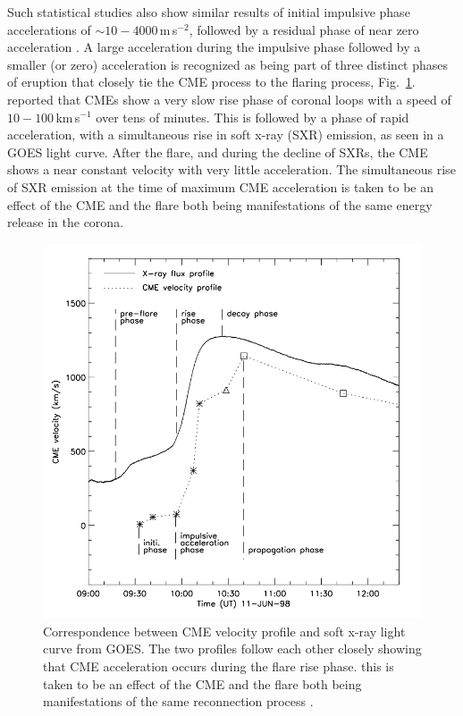 Such statistical studies also show similar results of initial impulsive phase accelerations of $\sim10-4000$\,m\,s$^{-2}$, followed by a residual phase of near zero acceleration \citep{vrsnak2007, temmer2010}. A large acceleration during the impulsive phase followed by a smaller (or zero) acceleration is recognized as being part of three distinct phases of eruption that closely tie the CME process to the flaring process, Fig.~\ref{fig:zhang2001}. \citet{zhang2001, zhang2004} reported that CMEs show a very slow rise phase of coronal loops with a speed of $10-100$\,km\,s$^{-1}$ over tens of minutes. This is followed by a phase of rapid acceleration, with a simultaneous rise in soft x-ray (SXR) emission, as seen in a GOES light curve. After the flare, and during the decline of SXRs, the CME shows a near constant velocity with very little acceleration. The simultaneous rise of SXR emission at the time of maximum CME acceleration is taken to be an effect of the CME and the flare both being manifestations of the same energy release in the corona.

\begin{figure}[t!]
\begin{center}
\includegraphics[scale=0.4, trim =0cm 1cm 0cm 1cm]{images/zhang2001}
\caption[CME speed profile along side flare X-ray light curve]{Correspondence between CME velocity profile and soft x-ray light curve from GOES. The two profiles follow each other closely showing that CME acceleration occurs during the flare rise phase. this is taken to be an effect of the CME and the flare both being manifestations of the same reconnection process \citep{zhang2001}.}
\label{fig:zhang2001}
\end{center}
\end{figure}


